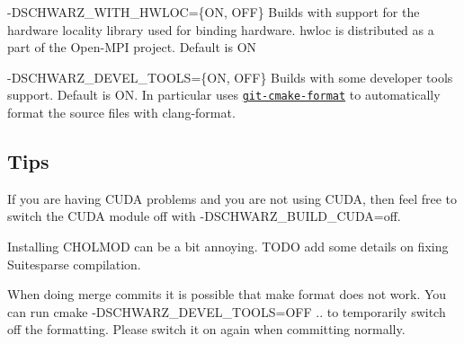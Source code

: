 \begin{DoxyItemize}
\item {\ttfamily -\/\+D\+S\+C\+H\+W\+A\+R\+Z\+\_\+\+W\+I\+T\+H\+\_\+\+H\+W\+L\+OC=\{ON, O\+FF\}} Builds with support for the hardware locality library used for binding hardware. {\ttfamily hwloc} is distributed as a part of the Open-\/\+M\+PI project. Default is {\ttfamily ON}
\item {\ttfamily -\/\+D\+S\+C\+H\+W\+A\+R\+Z\+\_\+\+D\+E\+V\+E\+L\+\_\+\+T\+O\+O\+LS=\{ON, O\+FF\}} Builds with some developer tools support. Default is {\ttfamily ON}. In particular uses \href{https://github.com/ginkgo-project/git-cmake-format}{\tt {\ttfamily git-\/cmake-\/format}} to automatically format the source files with {\ttfamily clang-\/format}.
\end{DoxyItemize}

\subsection*{Tips}


\begin{DoxyItemize}
\item If you are having C\+U\+DA problems and you are not using C\+U\+DA, then feel free to switch the C\+U\+DA module off with {\ttfamily -\/\+D\+S\+C\+H\+W\+A\+R\+Z\+\_\+\+B\+U\+I\+L\+D\+\_\+\+C\+U\+DA=off}.
\item Installing C\+H\+O\+L\+M\+OD can be a bit annoying. T\+O\+DO add some details on fixing Suitesparse compilation.
\item When doing merge commits it is possible that make format does not work. You can run {\ttfamily cmake -\/\+D\+S\+C\+H\+W\+A\+R\+Z\+\_\+\+D\+E\+V\+E\+L\+\_\+\+T\+O\+O\+LS=O\+FF ..} to temporarily switch off the formatting. Please switch it on again when committing normally. 
\end{DoxyItemize}